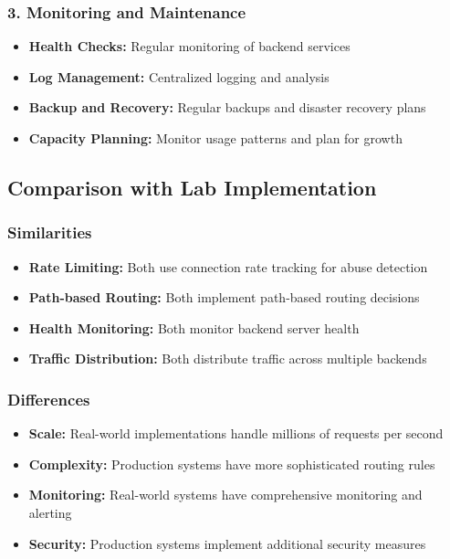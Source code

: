 \documentclass[12pt]{article}
\begin{document}
\subsubsection{3. Monitoring and Maintenance}
\begin{itemize}
    \item \textbf{Health Checks:} Regular monitoring of backend services
    \item \textbf{Log Management:} Centralized logging and analysis
    \item \textbf{Backup and Recovery:} Regular backups and disaster recovery plans
    \item \textbf{Capacity Planning:} Monitor usage patterns and plan for growth
\end{itemize}

\subsection{Comparison with Lab Implementation}

\subsubsection{Similarities}
\begin{itemize}
    \item \textbf{Rate Limiting:} Both use connection rate tracking for abuse detection
    \item \textbf{Path-based Routing:} Both implement path-based routing decisions
    \item \textbf{Health Monitoring:} Both monitor backend server health
    \item \textbf{Traffic Distribution:} Both distribute traffic across multiple backends
\end{itemize}

\subsubsection{Differences}
\begin{itemize}
    \item \textbf{Scale:} Real-world implementations handle millions of requests per second
    \item \textbf{Complexity:} Production systems have more sophisticated routing rules
    \item \textbf{Monitoring:} Real-world systems have comprehensive monitoring and alerting
    \item \textbf{Security:} Production systems implement additional security measures
\end{itemize}
\end{document}
